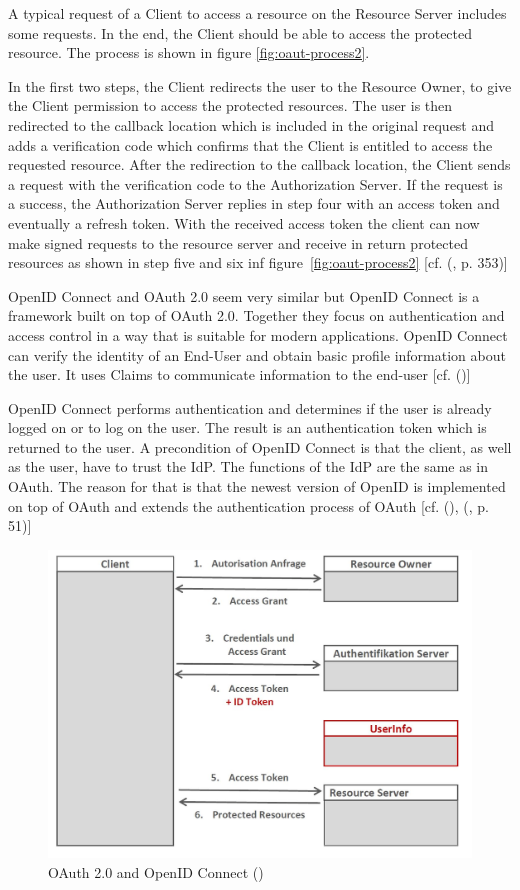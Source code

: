 {{		A typical request of a Client to access a resource on the Resource Server includes some requests. In the end, the Client should be able to access the protected resource. The process is shown in figure \ref{fig:oaut-process2}.
			
		In the first two steps, the Client redirects the user to the Resource Owner, to give the Client permission to access the protected resources. The user is then redirected to the callback location which is included in the original request and adds a verification code which confirms that the Client is entitled to access the requested resource. After the redirection to the callback location, the Client sends a request with the verification code to the Authorization Server. If the request is a success, the Authorization Server replies in step four with an access token and eventually a refresh token. With the received access token the client can now make signed requests to the resource server and receive in return protected resources as shown in step five and six inf figure~\ref{fig:oaut-process2} [cf. (\cite{LeBlanc:2011:SocialApplications}, p. 353)]
		
		
		OpenID Connect and OAuth 2.0 seem very similar but OpenID Connect is a framework built on top of OAuth 2.0. Together they focus on authentication and access control in a way that is suitable for modern applications. OpenID Connect can verify the identity of an End-User and obtain basic profile information about the user. It uses Claims to communicate information to the end-user [cf. (\cite{Sakimura:2014:OpenIDConnect})]
		
		OpenID Connect performs authentication and determines if the user is already logged on or to log on the user. The result is an authentication token which is returned to the user. A precondition of OpenID Connect is that the client, as well as the user, have to trust the IdP. The functions of the IdP are the same as in OAuth. The reason for that is that the newest version of OpenID is implemented on top of OAuth and extends the authentication process of OAuth  [cf. (\cite{Sakimura:2014:OpenIDConnect}), (\cite{Boyd:2012:GSOAuth}, p. 51)]
		
		\begin{figure}[h]
			\centering
			\includegraphics[width=0.8\linewidth]{images/openid-process}
			\caption{OAuth 2.0 and OpenID Connect (\cite{Lodderstedt:2014:OpenID})}
			\label{fig:openid-process}
		\end{figure}
		
}}

